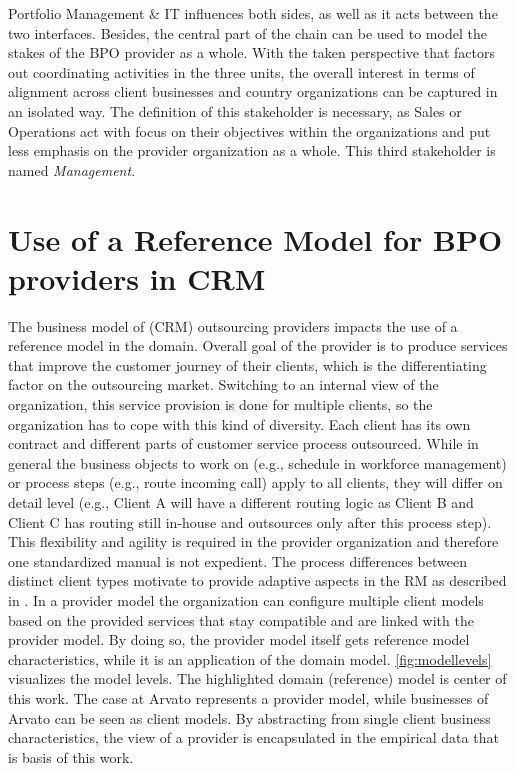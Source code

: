   Portfolio Management \& IT influences both sides, as well as it acts between the two interfaces. Besides, the central part of the chain can be used to model the stakes of the BPO provider as a whole. With the taken perspective that factors out coordinating activities in the three units, the overall interest in terms of alignment across client businesses and country organizations can be captured in an isolated way. The definition of this stakeholder is necessary, as Sales or Operations act with focus on their objectives within the organizations and put less emphasis on the provider organization as a whole. This third stakeholder is named \textit{Management}. 
  

\section{Use of a Reference Model for BPO providers in CRM}
\label{sec:refmodusearvato}
The business model of (CRM) outsourcing providers impacts the use of a reference model in the domain. Overall goal of the provider is to produce services that improve the customer journey of their clients, which is the differentiating factor on the outsourcing market. Switching to an internal view of the organization, this service provision is done for multiple clients, so the organization has to cope with this kind of diversity. Each client has its own contract and different parts of customer service process outsourced. While in general the business objects to work on (e.g., schedule in workforce management) or process steps (e.g., route incoming call) apply to all clients, they will differ on detail level (e.g., Client A will have a different routing logic as Client B and Client C has routing still in-house and outsources only after this process step). This flexibility and agility is required in the provider organization and therefore one standardized manual is not expedient. 
The process differences between distinct client types motivate to provide adaptive aspects in the \acrshort{RM} as described in \citep{delfmann2006adaptive}. In a provider model the organization can configure multiple client models based on the provided services that stay compatible and are linked with the provider model. By doing so, the provider model itself gets reference model characteristics, while it is an application of the domain model. \Fig \ref{fig:modellevels} visualizes the model levels. The highlighted domain (reference) model is center of this work. The case at Arvato represents a provider model, while businesses of Arvato can be seen as client models. By abstracting from single client business characteristics, the view of a provider is encapsulated in the empirical data that is basis of this work. 
